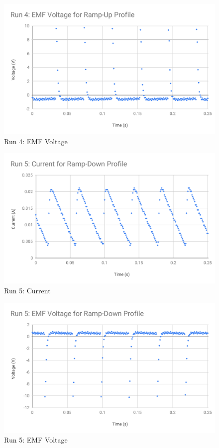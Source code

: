 \begin{figure}[ht]
	\centering
	\includegraphics[scale=0.74]{image/04-faraday/run-4-V.pdf}
	\caption{Run 4: EMF Voltage}
	\label{figure.04.run.4.V}
\end{figure}
\begin{figure}[ht]
	\centering
	\includegraphics[scale=0.74]{image/04-faraday/run-5-I.pdf}
	\caption{Run 5: Current}
	\label{figure.04.run.5.I}
\end{figure}
\begin{figure}[ht]
	\centering
	\includegraphics[scale=0.74]{image/04-faraday/run-5-V.pdf}
	\caption{Run 5: EMF Voltage}
	\label{figure.04.run.5.V}
\end{figure}
